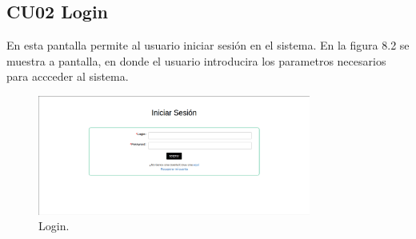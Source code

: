 \subsection{CU02 Login}
{
\justify
{}
}
\justify
En esta pantalla permite al usuario iniciar sesión en el sistema.
{
\justify
{}
}
\justify
En la figura 8.2 se muestra a pantalla, en donde el usuario introducira los parametros necesarios para accceder al sistema.

\begin{figure}[htb]
\centering
\includegraphics[width=0.8\textwidth]{./images/cu02-login.png}
\caption{Login.} \label{fig:horizonte}
\end{figure}